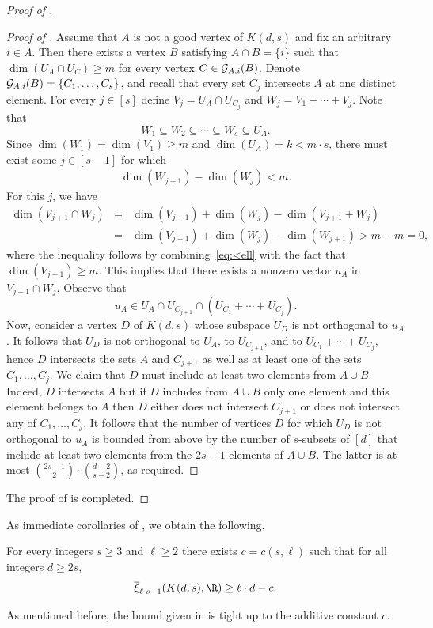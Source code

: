 \documentclass{toc}
\newcommand{\od}{\overline{\xi}}
\newcommand{\calG}{{\cal G}}
\begin{document}
\begin{proof}[Proof of ]
\begin{proof}[Proof of ]
Assume that $A$ is not a good vertex of $K(d,s)$ and fix an arbitrary $i \in A$. Then there exists a vertex $B$ satisfying $A \cap B = \{i\}$ such that $\dim(U_A \cap U_C) \geq m$ for every vertex $C \in \calG_{A,i}(B)$.
Denote $\calG_{A,i}(B) = \{C_1,\ldots,C_s\}$, and recall that every set $C_j$ intersects $A$ at one distinct element. For every $j \in [s]$ define $V_j = U_A \cap U_{C_j}$ and $W_j = V_1 + \cdots + V_j$. Note that
\[W_1 \subseteq W_2 \subseteq \cdots \subseteq W_s \subseteq U_A.\]
Since $\dim(W_1) = \dim(V_1) \geq m$ and $\dim(U_A)= k < m \cdot s$, there must exist some $j \in [s-1]$ for which
\begin{eqnarray}\label{eq:<ell}
\dim(W_{j+1}) - \dim(W_j) < m.
\end{eqnarray}
For this $j$, we have
\begin{eqnarray*}
\dim(V_{j+1} \cap W_j) &=& \dim(V_{j+1})+ \dim(W_j)- \dim(V_{j+1}+W_j)
\\ &=& \dim(V_{j+1})+ \dim(W_j) - \dim(W_{j+1}) > m-m=0,
\end{eqnarray*}
where the inequality follows by combining~\eqref{eq:<ell} with the fact that $\dim(V_{j+1}) \geq m$.
This implies that there exists a nonzero vector $u_A$ in $V_{j+1} \cap W_j$.
Observe that
\[u_A \in U_A \cap U_{C_{j+1}} \cap (U_{C_1} +\cdots+U_{C_j}).\]
Now, consider a vertex $D$ of $K(d,s)$ whose subspace $U_D$ is not orthogonal to $u_A$.
It follows that $U_D$ is not orthogonal to $U_A$, to $U_{C_{j+1}}$, and to $U_{C_1} +\cdots+U_{C_j}$, hence $D$ intersects the sets $A$ and $C_{j+1}$ as well as at least one of the sets $C_1,\ldots,C_{j}$.
We claim that $D$ must include at least two elements from $A \cup B$.
Indeed, $D$ intersects $A$ but if $D$ includes from $A \cup B$ only one element and this element belongs to $A$ then $D$ either does not intersect $C_{j+1}$ or does not intersect any of $C_1,\ldots,C_{j}$.
It follows that the number of vertices $D$ for which $U_D$ is not orthogonal to $u_A$ is bounded from above by the number of $s$-subsets of $[d]$ that include at least two elements from the $2s-1$ elements of $A \cup B$. The latter is at most $\binom{2s-1}{2} \cdot \binom{d-2}{s-2}$, as required.
\end{proof}
The proof
of   %
is completed.
\end{proof}

As immediate corollaries of , we obtain the following.
\begin{corollary}\label{cor:ls-1}
For every integers $s \geq 3$ and $\ell \geq 2$ there exists $c=c(s,\ell)$ such that for all integers $d \geq 2s$,
\[\od_{\ell \cdot s-1}(K(d,s),\R) \geq \ell \cdot d-c.\]
\end{corollary}
\noindent
As mentioned before, the bound given in  is tight up to the additive constant $c$.
\end{document}
